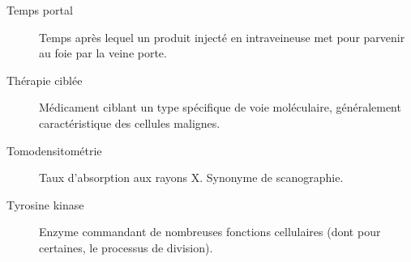 \documentclass[main.tex]{subfiles}
\begin{document}
\begin{description}
\item[Temps portal] Temps après lequel un produit injecté en intraveineuse met pour parvenir au foie par la veine porte.
\item[Thérapie ciblée] Médicament ciblant un type spécifique de voie moléculaire, généralement caractéristique des cellules malignes. 
\item[Tomodensitométrie] Taux d'absorption aux rayons X. Synonyme de scanographie. 
\item[Tyrosine kinase] Enzyme commandant de nombreuses fonctions cellulaires (dont pour certaines, le processus de division).
\end{description}
\end{document}
